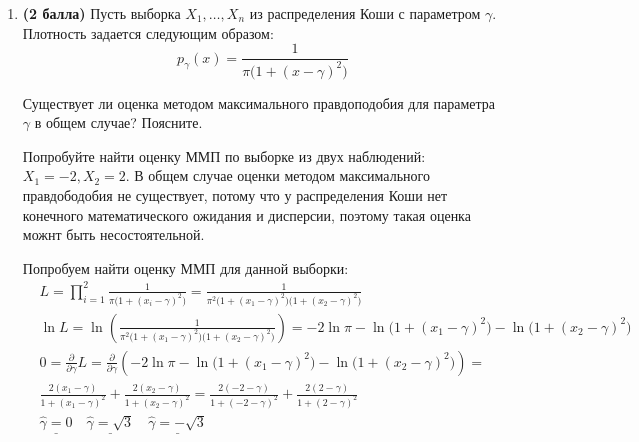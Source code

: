 \documentclass{assignment}
\begin{document}
\begin{enumerate}
    \item \textbf{(2 балла)} Пусть выборка $X_1, \ldots, X_n$ из  распределения Коши с параметром $\gamma$. 
    Плотность задается следующим образом:
    $$
    p_{\gamma}(x) = \frac{1}{\pi \big(1 + (x - \gamma)^2\big)}
    $$

    Существует ли оценка методом максимального правдоподобия для параметра $\gamma$ в общем случае? Поясните.

    Попробуйте найти оценку ММП по выборке из двух наблюдений: $X_1 = -2, X_2 = 2$.
    \start
    В общем случае оценки методом максимального правдободобия не существует, потому что у распределения Коши нет конечного математического ожидания и дисперсии, поэтому такая оценка можнт быть несостоятельной.

    Попробуем найти оценку ММП для данной выборки:
    \begin{align*}
        &L = \prod_{i=1}^{2} \frac{1}{\pi \big(1 + (x_i - \gamma)^2\big)} = \frac{1}{\pi^2 \big(1 + (x_1 - \gamma)^2\big)\big(1 + (x_2 - \gamma)^2\big)} \\
        &\ln L = \ln (\frac{1}{\pi^2 \big(1 + (x_1 - \gamma)^2\big)\big(1 + (x_2 - \gamma)^2\big)}) = - 2\ln\pi - \ln \big(1 + (x_1 - \gamma)^2\big) - \ln \big(1 + (x_2 - \gamma)^2\big) \\
        &0 = \frac{\partial}{\partial \gamma} L = \frac{\partial}{\partial \gamma} (- 2\ln\pi - \ln \big(1 + (x_1 - \gamma)^2\big) - \ln \big(1 + (x_2 - \gamma)^2\big)) = \\
        &\frac{2(x_1 - \gamma)}{1 + (x_1 - \gamma)^2} + \frac{2(x_2 - \gamma)}{1 + (x_2 - \gamma)^2} = \frac{2(-2 - \gamma)}{1 + (-2 - \gamma)^2} + \frac{2(2 - \gamma)}{1 + (2 - \gamma)^2} \\
        &\underline{\hat{\gamma} = 0} \quad \underline{\hat{\gamma} = \sqrt{3}} \quad \underline{\hat{\gamma} = -\sqrt{3}}
    \end{align*}
    \finish
\end{enumerate}
    
\end{document}
